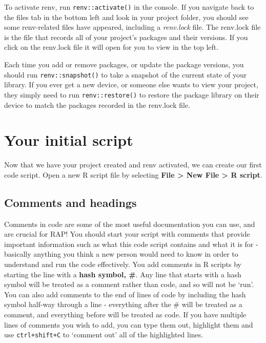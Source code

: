 \documentclass[
  12pt,
]{article}
\begin{document}
To activate renv, run \texttt{renv::activate()} in the console. If you
navigate back to the files tab in the bottom left and look in your
project folder, you should see some renv-related files have appeared,
including a \emph{renv.lock} file. The renv.lock file is the file that
records all of your project's packages and their versions. If you click
on the renv.lock file it will open for you to view in the top left.

Each time you add or remove packages, or update the package versions,
you should run \texttt{renv::snapshot()} to take a snapshot of the
current state of your library. If you ever get a new device, or someone
else wants to view your project, they simply need to run
\texttt{renv::restore()} to restore the package library on their device
to match the packages recorded in the renv.lock file.

\hypertarget{your-initial-script}{%
\section{Your initial script}\label{your-initial-script}}

Now that we have your project created and renv activated, we can create
our first code script. Open a new R script file by selecting
\textbf{File \textgreater{} New File \textgreater{} R script}.

\hypertarget{comments-and-headings}{%
\subsection{Comments and headings}\label{comments-and-headings}}

Comments in code are some of the most useful documentation you can use,
and are crucial for RAP! You should start your script with comments that
provide important information such as what this code script contains and
what it is for - basically anything you think a new person would need to
know in order to understand and run the code effectively. You add
comments in R scripts by starting the line with a \textbf{hash symbol,
\#}. Any line that starts with a hash symbol will be treated as a
comment rather than code, and so will not be `run'. You can also add
comments to the end of lines of code by including the hash symbol
half-way through a line - everything after the \# will be treated as a
comment, and everything before will be treated as code. If you have
multiple lines of comments you wish to add, you can type them out,
highlight them and use \texttt{ctrl+shift+C} to `comment out' all of the
highlighted lines.
\end{document}
